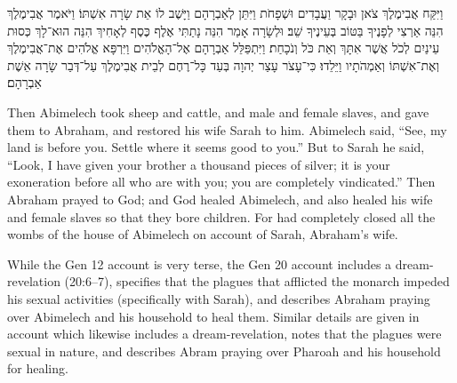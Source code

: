\begin{hebrewtext}
    וַיִּקַּח אֲבִימֶלֶךְ צֹאן וּבָקָר וַעֲבָדִים וּשְׁפָחֹת וַיִּתֵּן לְאַבְרָהָם וַיָּשֶׁב לוֹ אֵת שָׂרָה אִשְׁתּוֹ׃
    וַיֹּאמֶר אֲבִימֶלֶךְ הִנֵּה אַרְצִי לְפָנֶיךָ בַּטּוֹב בְּעֵינֶיךָ שֵׁב׃
    וּלְשָׂרָה אָמַר הִנֵּה נָתַתִּי אֶלֶף כֶּסֶף לְאָחִיךְ הִנֵּה הוּא־לָךְ כְּסוּת עֵינַיִם לְכֹל אֲשֶׁר אִתָּךְ וְאֵת כֹּל וְנֹכָחַת׃
    וַיִּתְפַּלֵּל אַבְרָהָם אֶל־הָאֱלֹהִים וַיִּרְפָּא אֱלֹהִים אֶת־אֲבִימֶלֶךְ וְאֶת־אִשְׁתּוֹ וְאַמְהֹתָיו וַיֵּלֵדוּ׃
    כִּי־עָצֹר עָצַר יְהוָה בְּעַד כָּל־רֶחֶם לְבֵית אֲבִימֶלֶךְ עַל־דְּבַר שָׂרָה אֵשֶׁת אַבְרָהָם׃  
\end{hebrewtext}

\begin{translation}
    Then Abimelech took sheep and cattle, and male and female slaves, and gave them to Abraham, and restored his wife Sarah to him.
    Abimelech said, ``See, my land is before you. Settle where it seems good to you.'' 
    But to Sarah he said, ``Look, I have given your brother a thousand pieces of silver; it is your exoneration before all who are with you; you are completely vindicated.'' 
    Then Abraham prayed to God; and God healed Abimelech, and also healed his wife and female slaves so that they bore children. 
    For \yahweh had completely closed all the wombs of the house of Abimelech on account of Sarah, Abraham's wife.
\end{translation}
\noindent
While the Gen 12 account is very terse, the Gen 20 account includes a dream-revelation (20:6--7), specifies that the plagues that afflicted the monarch impeded his sexual activities (specifically with Sarah), and describes Abraham praying over Abimelech and his household to heal them. Similar details are given in \ga account which likewise includes a dream-revelation, notes that the plagues were sexual in nature, and describes Abram praying over Pharoah and his household for healing. 

